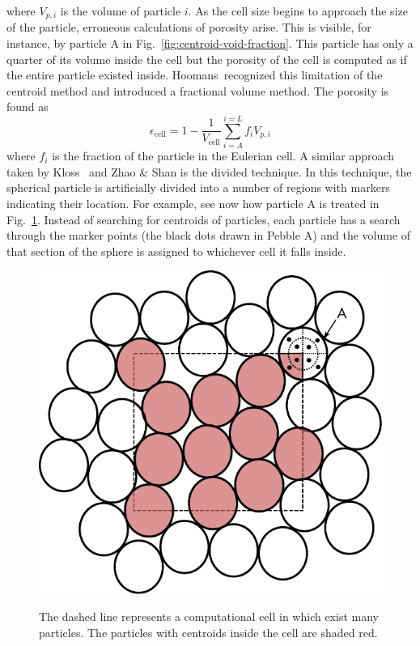 where $V_{p,i}$ is the volume of particle $i$. As the cell size begins to approach the size of the particle, erroneous calculations of porosity arise. This is visible, for instance, by particle A in Fig.~\ref{fig:centroid-void-fraction}. This particle has only a quarter of its volume inside the cell but the porosity of the cell is computed as if the entire particle existed inside. Hoomans\etal~recognized this limitation of the centroid method and introduced a fractional volume method.\cite{Hoomans1996} The porosity is found as
\begin{equation}
	\epsilon_\text{cell} = 1-\frac{1}{V_\text{cell}}\sum_{i = A}^{i=L}f_iV_{p,i}
\end{equation}
where $f_i$ is the fraction of the particle in the Eulerian cell. A similar approach taken by Kloss\etal~ and Zhao \& Shan is the divided technique.\cite{Kloss2012,Zhao2013a} In this technique, the spherical particle is artificially divided into a number of regions with markers indicating their location. For example, see now how particle A is treated in Fig.~\ref{fig:centroid-void-fraction-divided}. Instead of searching for centroids of particles, each particle has a search through the marker points (the black dots drawn in Pebble A) and the volume of that section of the sphere is assigned to whichever cell it falls inside. 
\begin{figure}[t]
	\centering
	\caption{The dashed line represents a computational cell in which exist many particles. The particles with centroids inside the cell are shaded red.}
	\includegraphics[width=\singleimagewidth]{chapters/figures/void-fraction-divided-cell.pdf}\label{fig:centroid-void-fraction-divided}
\end{figure}

